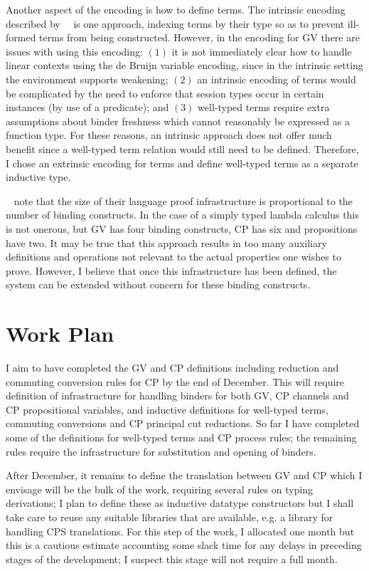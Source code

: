 \documentclass{mprop}
\begin{document}
Another aspect of the encoding is how to define terms. The intrinsic encoding
described by~\citeauthor{Benton:2012:STT}~\cite{Benton:2012:STT} is one
approach, indexing terms by their type so as to prevent ill-formed terms from
being constructed. However, in the encoding for GV there are issues with using
this encoding: $(1)$ it is not immediately clear how to handle linear contexts
using the de Bruijn variable encoding, since in the intrinsic setting the
environment supports weakening; $(2)$ an intrinsic encoding of terms would be
complicated by the need to enforce that session types occur in certain
instances (by use of a predicate); and $(3)$ well-typed terms require extra
assumptions about binder freshness which cannot reasonably be expressed as a
function type. For these reasons, an intrinsic approach does not offer much
benefit since a well-typed term relation would still need to be
defined. Therefore, I chose an extrinsic encoding for terms and define
well-typed terms as a separate inductive type.

\citeauthor{Aydemir:2008:EFM}~\cite{Aydemir:2008:EFM} note that the size of
their language proof infrastructure is proportional to the number of binding
constructs. In the case of a simply typed lambda calculus this is not onerous,
but GV has four binding constructs, CP has six and propositions have two. It
may be true that this approach results in too many auxiliary definitions and
operations not relevant to the actual properties one wishes to prove. However,
I believe that once this infrastructure has been defined, the system can be
extended without concern for these binding constructs.

\section{Work Plan}

I aim to have completed the GV and CP definitions including reduction and
commuting conversion rules for CP by the end of December. This will require
definition of infrastructure for handling binders for both GV, CP channels and
CP propositional variables, and inductive definitions for well-typed terms,
commuting conversions and CP principal cut reductions. So far I have completed
some of the definitions for well-typed terms and CP process rules; the
remaining rules require the infrastructure for substitution and opening of
binders.

After December, it remains to define the translation between GV and CP which I
envisage will be the bulk of the work, requiring several rules on typing
derivations; I plan to define these as inductive datatype constructors but I
shall take care to reuse any suitable libraries that are available, e.g. a
library for handling CPS translations. For this step of the work, I allocated
one month but this is a cautious estimate accounting some slack time for any
delays in preceding stages of the development; I suspect this stage will not
require a full month.
\end{document}
